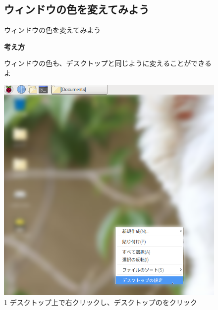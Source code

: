\documentclass[a4paper,12pt]{jarticle}
\begin{document}
\begin{figure}
  \subsection{\theExercise ウィンドウの色を変えてみよう}
  ウィンドウの色を変えてみよう

  \textbf{考え方}


  \bigskip



  \centering
  \begin{minipage}{\textwidth}
      ウィンドウの色も、デスクトップと同じように変えることができるよ
  \end{minipage}
  \begin{minipage}{\textwidth}
    \begin{minipage}{0.45\linewidth}
      \includegraphics[width=\linewidth]{textbook-img107.png}\\
      1 デスクトップ上で右クリックし、デスクトップのをクリック
    \end{minipage}
    \begin{minipage}{2.582cm}

\end{minipage}
\end{minipage}
\end{figure}
\end{document}
